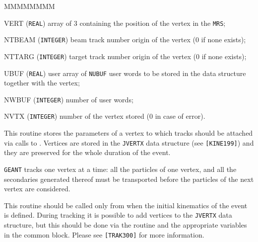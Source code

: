               
              

 
\begin{DLtt}{MMMMMMMM}
\item[VERT] ({\tt REAL}) array of 3 containing the position of 
the vertex in the {\tt MRS};
\item[NTBEAM] ({\tt INTEGER}) beam track number origin of the vertex
(0 if none exists);
\item[NTTARG] ({\tt INTEGER}) target track number origin of the vertex
(0 if none exists);
\item[UBUF] ({\tt REAL}) user array of {\tt NUBUF} user words
to be stored in the data structure together with the vertex;
\item[NWBUF] ({\tt INTEGER}) number of user words;
\item[NVTX] ({\tt INTEGER}) number of the vertex stored (0 in case of error).
\end{DLtt}

This routine stores the parameters of a vertex to which tracks should be
attached via calls to . Vertices are stored in the {\tt JVERTX}
data structure (see {\tt [KINE199]}) and they are preserved for the whole
duration of the event.

{\tt GEANT} tracks one vertex at a time: all the particles of one
vertex, and all the secondaries generated thereof must be transported
before the particles of the next vertex are considered.

This routine should be called only from  when the initial
kinematics of the event is defined. During tracking it is possible to add
vertices to the {\tt JVERTX} data structure, but this should be done via
the  routine and the appropriate variables in the 
common block. Please see {\tt [TRAK300]} for more information.

